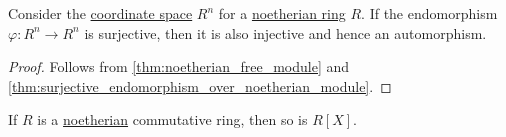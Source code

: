 \begin{proposition}\label{thm:surjective_endomorphism_in_free_module}
  Consider the \hyperref[def:coordinate_space]{coordinate space} \( R^n \) for a \hyperref[def:noetherian_semiring]{noetherian ring} \( R \). If the endomorphism \( \varphi: R^n \to R^n \) is surjective, then it is also injective and hence an automorphism.
\end{proposition}
\begin{proof}
  Follows from \cref{thm:noetherian_free_module} and \cref{thm:surjective_endomorphism_over_noetherian_module}.
\end{proof}

\begin{theorem}\label{thm:hilberts_basis_theorem}
  If \( R \) is a \hyperref[def:noetherian_semiring]{noetherian} commutative ring, then so is \( R[X] \).
\end{theorem}
